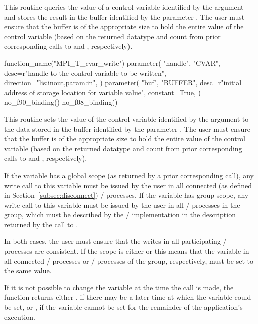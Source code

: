 This routine queries the value of a control variable identified by the
argument  and stores the result in the buffer identified by
the parameter .  The user must ensure that the buffer is of the
appropriate size to hold the entire value of the control variable (based on
the returned datatype and count from prior corresponding calls to
 and
, respectively).

\begin{mpi-binding}
    function_name("MPI_T_cvar_write")
    parameter(
        "handle",
        "CVAR",
        desc=r"handle to the control variable to be written",
        direction="lis:inout,param:in",
    )
    parameter(
        "buf",
        "BUFFER",
        desc=r"initial address of storage location for variable value",
        constant=True,
    )
    no_f90_binding()
    no_f08_binding()
\end{mpi-binding}

This routine sets the value of the control variable identified by the
argument  to the data stored in the buffer identified by the
parameter .  The user must ensure that the buffer is of the
appropriate size to hold the entire value of the control variable (based on
the returned datatype and count from prior corresponding calls to
 and
, respectively).

If the variable has a global scope (as returned by a prior corresponding
 call), any write call to this variable
must be issued by the user in all connected (as defined in
Section~\ref{subsec:disconnect}) \MPI/ processes.  If the variable has
group scope, any write call to this variable must be issued by the user in
all \MPI/ processes in the group, which must be described by the \MPI/
implementation in the description returned by the call to .

In both cases, the user must ensure that the writes in all participating \MPI/ processes are
consistent.  If the scope is either  or
 this means that the variable in all
connected \MPI/ processes or \MPI/ processes of the group, respectively, must be set to the same value.

If it is not possible to change the variable at the time the call is made,
the function returns either , if
there may be a later time at which the variable could be set, or
, if the variable cannot be set for
the remainder of the application's execution.

